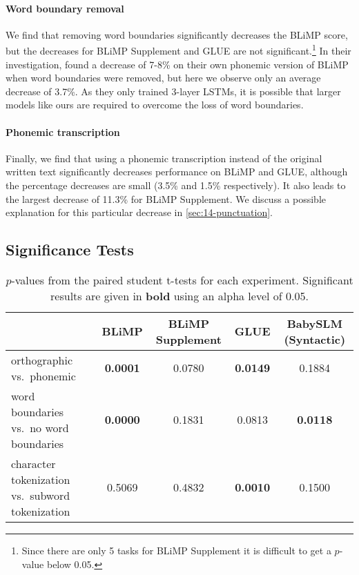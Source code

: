 \paragraph{Word boundary removal} We find that removing word boundaries significantly decreases the BLiMP score, but the decreases for BLiMP Supplement and GLUE are not significant.\footnote{Since there are only 5 tasks for BLiMP Supplement it is difficult to get a $p$-value below 0.05.} In their investigation, \citet{nguyen-2022-word-boundaries} found a decrease of 7-8\% on their own phonemic version of BLiMP when word boundaries were removed, but here we observe only an average decrease of 3.7\%. As they only trained 3-layer LSTMs, it is possible that larger models like ours are required to overcome the loss of word boundaries.

\paragraph{Phonemic transcription} Finally, we find that using a phonemic transcription instead of the original written text significantly decreases performance on BLiMP and GLUE, although the percentage decreases are small (3.5\% and 1.5\% respectively). It also leads to the largest decrease of 11.3\% for BLiMP Supplement. We discuss a possible explanation for this particular decrease in \cref{sec:14-punctuation}.


\subsection{Significance Tests}
\label{sec:14-significance}

\begin{table*}[t]
    \centering
    \small
    \begin{tabular}{l|cccc}
     & BLiMP&BLiMP Supplement & GLUE & BabySLM (Syntactic) \\
\hline
orthographic vs.\ phonemic & \textbf{0.0001} & 0.0780 & \textbf{0.0149} & 0.1884 \\
word boundaries vs.\ no word boundaries & \textbf{0.0000} & 0.1831 & 0.0813 & \textbf{0.0118} \\
character tokenization vs.\ subword tokenization & 0.5069 & 0.4832 & \textbf{0.0010} & 0.1500 \\
    \end{tabular}
    \caption{$p$-values from the paired student t-tests for each experiment. Significant results are given in \textbf{bold} using an alpha level of 0.05.}
    \label{tab:14-pvalues}
\end{table*}


